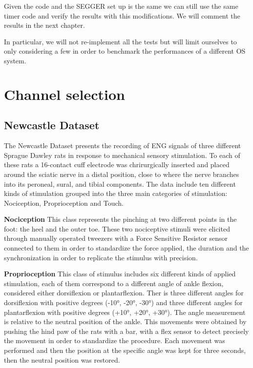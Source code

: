 \documentclass{Configuration_Files/PoliMi3i_thesis}
\begin{document}
Given the code and the SEGGER set up is the same we can still use the same timer code and verify the results with this modifications.
We will comment the results in the next chapter.

In particular, we will not re-implement all the tests but will limit ourselves to only considering a few in order to benchmark the performances of a different OS system.



\section{Channel selection}

\subsection{Newcastle Dataset}

The Newcastle Dataset presents the recording of ENG signals of three different Sprague Dawley rats in response to mechanical sensory stimulation.
To each of these rats a 16-contact cuff electrode was chrirurgically inserted and placed around the sciatic nerve in a distal position, close to where the nerve branches into its peroneal, sural, and tibial components.
The data include ten different kinds of stimulation grouped into the three main categories of stimulation: Nociception, Proprioception and Touch.

\textbf{Nociception} \quad This class represents the pinching at two different points in the foot: the heel and the outer toe.
These two nociceptive stimuli were elicited through manually operated tweezers with a Force Sensitive Resistor sensor connected to them in order to standardize the force applied, the duration and the synchronization in order to replicate the stimulus with precision.

\textbf{Proprioception} \quad This class of stimulus includes six different kinds of applied stimulation, each of them correspond to a different angle of ankle flexion, considered either dorsiflexion or plantarflexion.
Ther is three different angles for dorsiflexion with positive degrees (-10°, -20°, -30°) and three different angles for plantarflexion with positive degrees (+10°, +20°, +30°).
The angle measurement is relative to the neutral position of the ankle.
This movements were obtained by pushing the hind paw of the rats with a bar, with a flex sensor to detect precisely the movement in order to standardize the procedure.
Each movement was performed and then the position at the specific angle was kept for three seconds, then the neutral position was restored.
\end{document}
